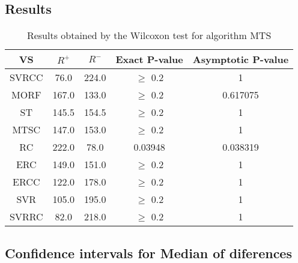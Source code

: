 \documentclass[a4paper,10pt]{article}
\begin{document}
\subsection{Results}

\begin{table}[!htp]
\centering\small
\begin{tabular}{
|c|c|c|c|c|}
\hline
 VS & $R^{+}$ & $R^{-}$ & Exact P-value & Asymptotic P-value \\ \hline 
SVRCC & 76.0 & 224.0 & $\geq$ 0.2 & 1\\ \hline 
MORF & 167.0 & 133.0 & $\geq$ 0.2 & 0.617075\\ \hline 
ST & 145.5 & 154.5 & $\geq$ 0.2 & 1\\ \hline 
MTSC & 147.0 & 153.0 & $\geq$ 0.2 & 1\\ \hline 
RC & 222.0 & 78.0 & 0.03948 & 0.038319\\ \hline 
ERC & 149.0 & 151.0 & $\geq$ 0.2 & 1\\ \hline 
ERCC & 122.0 & 178.0 & $\geq$ 0.2 & 1\\ \hline 
SVR & 105.0 & 195.0 & $\geq$ 0.2 & 1\\ \hline 
SVRRC & 82.0 & 218.0 & $\geq$ 0.2 & 1\\ \hline 

\end{tabular}
\caption{Results obtained by the Wilcoxon test for algorithm MTS}
\end{table}

\subsection{Confidence intervals for Median of diferences}
\end{document}
